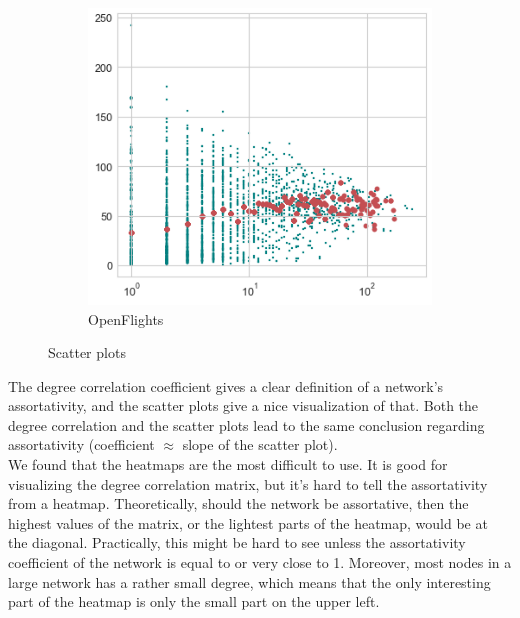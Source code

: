 \begin{figure}[h]
    ~
    \begin{subfigure}[b]{0.3\textwidth}
        \includegraphics[width=\textwidth]{img/scatter_2}
        \caption*{OpenFlights}
    \end{subfigure}
    \caption{Scatter plots}
\end{figure}



The degree correlation coefficient gives a clear definition of a network's assortativity, and the scatter plots give a nice visualization of that. 
Both the degree correlation and the scatter plots lead to the same conclusion regarding assortativity (coefficient $\approx$ slope of the scatter plot).\\

We found that the heatmaps are the most difficult to use. It is good for visualizing the degree correlation matrix, but it's hard to tell the assortativity from a heatmap.
Theoretically, should the network be assortative, then the highest values of the matrix, or the lightest parts of the heatmap, would be at the diagonal. Practically, this might be hard to see unless the assortativity coefficient of the network is equal to or very close to 1. 
Moreover, most nodes in a large network has a rather small degree, which means that the only interesting part of the heatmap is only the small part on the upper left. 
